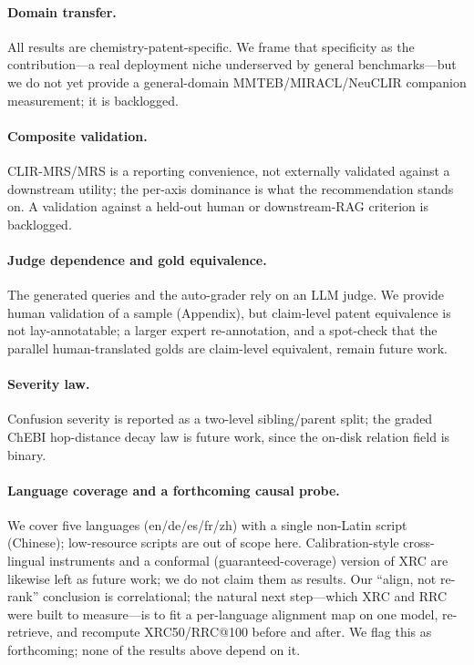 \documentclass[11pt]{article}
\begin{document}
\paragraph{Domain transfer.}
All results are chemistry-patent-specific. We frame that specificity as the
contribution---a real deployment niche underserved by general benchmarks---but
we do not yet provide a general-domain MMTEB/MIRACL/NeuCLIR companion
measurement; it is backlogged.

\paragraph{Composite validation.}
CLIR-MRS/MRS is a reporting convenience, not externally validated against a
downstream utility; the per-axis dominance is what the recommendation stands on.
A validation against a held-out human or downstream-RAG criterion is backlogged.

\paragraph{Judge dependence and gold equivalence.}
The generated queries and the auto-grader rely on an LLM judge. We provide human
validation of a sample (Appendix), but claim-level patent equivalence is not
lay-annotatable; a larger expert re-annotation, and a spot-check that the
parallel human-translated golds are claim-level equivalent, remain future work.

\paragraph{Severity law.}
Confusion severity is reported as a two-level sibling/parent split; the graded
ChEBI hop-distance decay law is future work, since the on-disk relation field is
binary.

\paragraph{Language coverage and a forthcoming causal probe.}
We cover five languages (en/de/es/fr/zh) with a single non-Latin script
(Chinese); low-resource scripts are out of scope here. Calibration-style
cross-lingual instruments and a conformal (guaranteed-coverage) version of XRC
are likewise left as future work; we do not claim them as results. Our
``align, not re-rank'' conclusion is correlational; the natural next step---which
XRC and RRC were built to measure---is to fit a per-language alignment map on one
model, re-retrieve, and recompute XRC50/RRC@100 before and after. We flag this as
forthcoming; none of the results above depend on it.
\end{document}

